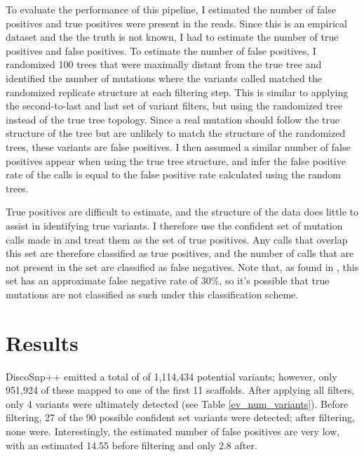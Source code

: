 To evaluate the performance of this pipeline, I estimated the number of false positives and true positives were present in the reads. Since this is an empirical dataset and the the truth is not known, I had to estimate the number of true positives and false positives. To estimate the number of false positives, I randomized 100 trees that were maximally distant from the true tree and identified the number of mutations where the variants called matched the randomized replicate structure at each filtering step. This is similar to applying the second-to-last and last set of variant filters, but using the randomized tree instead of the true tree topology. Since a real mutation should follow the true structure of the tree but are unlikely to match the structure of the randomized trees, these variants are false positives. I then assumed a similar number of false positives appear when using the true tree structure, and infer the false positive rate of the calls is equal to the false positive rate calculated using the random trees.  %

True positives are difficult to estimate, and the structure of the data does little to assist in identifying true variants. I therefore use the confident set of mutation calls made in \cite{orr_phylogenomic_2020} and treat them as the set of true positives. Any calls that overlap this set are therefore classified as true positives, and the number of calls that are not present in the set are classified as false negatives. Note that, as found in \cite{orr_phylogenomic_2020}, this set has an approximate false negative rate of 30\%, so it's possible that true mutations are not classified as such under this classification scheme.


\section{Results}

DiscoSnp++ emitted a total of of 1,114,434 potential variants; however, only 951,924 of these mapped to one of the first 11 scaffolds. After applying all filters, only 4 variants were ultimately detected (see Table \ref{ev_num_variants}). Before filtering, 27 of the 90 possible confident set variants were detected; after filtering, none were. Interestingly, the estimated number of false positives are very low, with an estimated 14.55 before filtering and only 2.8 after.


